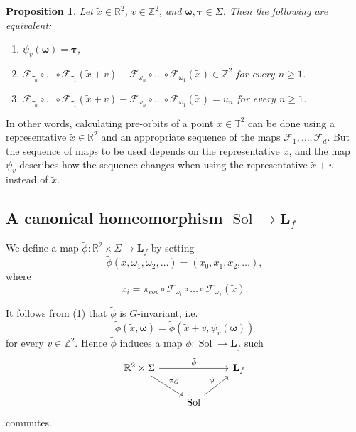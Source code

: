 \documentclass[11pt,letterpaper,reqno]{article}
\newtheorem{proposition}{Proposition}[section]
\newcommand{\TT}{\mathbb{T}^2}
\newcommand{\RR}{\mathbb{R}^2}
\newcommand{\ZZ}{\mathbb{Z}^2}
\newcommand{\hTTf}[1][f]{\mathbf{L}_{#1}}
\newcommand{\cF}{\mathcal{F}}
\newcommand{\tx}{\tilde{x}}
\newcommand{\bomega}{\boldsymbol{\omega}}
\newcommand{\Sol}{\operatorname{Sol}}
\begin{document}
\begin{proposition} \label{difference_in_Z2}
Let $\tx \in \RR$, $v \in \ZZ$, and $\bomega, \boldsymbol{\tau} \in \Sigma$. Then the following are equivalent:
\begin{enumerate}
\item $\psi_v(\bomega) = \boldsymbol{\tau}$, 
\item $\cF_{\tau_n} \circ \ldots \circ \cF_{\tau_1} (\tx+v) -\cF_{\omega_n} \circ \ldots \circ \cF_{\omega_1}(\tx) \in \ZZ $
for every $n\geq 1$.
\item $\cF_{\tau_n} \circ \ldots \circ \cF_{\tau_1} (\tx+v) -\cF_{\omega_n} \circ \ldots \circ \cF_{\omega_1}(\tx) = u_n $
for every $n\geq 1$.
\end{enumerate}
\end{proposition}

In other words, calculating pre-orbits of a point $x \in \TT$ can be done using a representative $\tx \in \RR$ and an appropriate sequence of the maps $\cF_1, \dots, \cF_d$. But the sequence of maps to be used depends on the representative $\tx$, and the map $\psi_v$ describes how the sequence changes when using the representative $\tx+v$ instead of $\tx$.


\subsection{A canonical homeomorphism \texorpdfstring{$\Sol \to \hTTf$}{Sol to Lf}}

  We define a map $\tilde{\phi}: \RR \times \Sigma \to \hTTf$ by setting 
\[\tilde{\phi} (\tx, \omega_1, \omega_2, \ldots) = (x_0, x_1, x_2, \ldots),\]
where 
\begin{equation} \label{x_i}
x_i = \pi_{cov} \circ  \cF_{\omega_i} \circ \ldots \circ \cF_{\omega_1} (\tx).
\end{equation}

It follows from (\ref{difference_in_Z2}) that $\tilde{\phi}$ is $G$-invariant, i.e. 
\[\tilde{\phi}(\tx, \bomega) = \tilde{\phi}(\tx+v, \psi_{v}(\bomega))\]
for every $v \in \ZZ$. Hence $\tilde{\phi}$ induces a map $\phi: \Sol \to \hTTf$ such 
\begin{equation}
\begin{tikzcd}
\RR \times \Sigma \ar[rr, "\tilde{\phi}"] \ar[rd, "\pi_G"] && \hTTf \\
& \Sol \ar[ur, "\phi"]
\end{tikzcd}
\end{equation}
commutes.
\end{document}
